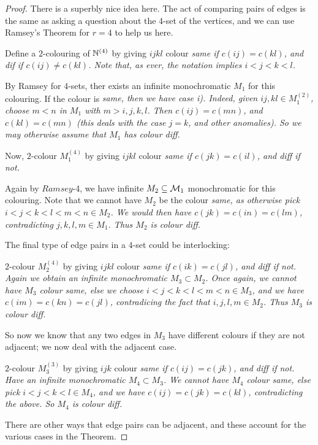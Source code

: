 \documentclass[10pt]{article}
\begin{document}
\begin{proof}
    There is a superbly nice idea here. The act of comparing pairs of edges is the same as asking a question about the 4-set of the vertices, and we can use Ramsey's Theorem for $r = 4$ to help us here.

    Define a $2$-colouring of $\mathbb{N}^{(4)}$ by giving $ijkl$ colour \it{same} if $c(ij) = c(kl)$, and \it{dif} if $c(ij)\ne c(kl)$. Note that, as ever, the notation implies $i<j<k<l$.

    By Ramsey for $4$-sets, ther exists an infinite monochromatic $M_1$ for this colouring. If the colour is \it{same}, then we have case i). Indeed, given $ij,kl\in M_1^{(2)}$, choose $m < n$ in $M_1$ with $m > i,j,k,l$. Then $c(ij) = c(mn)$, and $c(kl) = c(mn)$ (this deals with the case $j= k$, and other anomalies). So we may otherwise assume that $M_1$ has colour diff.

    Now, $2$-colour $M_1^{(4)}$ by giving $ijkl$ colour \it{same} if $c(jk) = c(il)$, and \it{diff} if not.

    Again by $Ramsey$-4, we have infinite $M_2\subseteq \mathcal{M}_1$ monochromatic for this colouring. Note that we cannot have $M_2$ be the colour \it{same}, as otherwise pick $i < j < k < l < m < n \in M_2$. We would then have $c(jk) = c(in) = c(lm)$, contradicting $j,k,l,m \in M_1$. Thus $M_2$ is colour \it{diff}.

    The final type of edge pairs in a $4$-set could be interlocking:

    $2$-colour $M_2^{(4)}$ by giving $ijkl$ colour \it{same} if $c(ik) = c(jl)$, and \it{diff} if not. Again we obtain an infinite monochromatic $M_3 \subset M_2$. Once again, we cannot have $M_3$ colour \it{same}, else we choose $i < j < k < l < m < n \in M_3$, and we have $c(im) = c(kn) = c(jl)$, contradicing the fact that $i,j,l,m \in M_2$. Thus $M_3$ is colour \it{diff}.

    So now we know that any two edges in $M_3$ have different colours if they are not adjacent; we now deal with the adjacent case.

    $2$-colour $M_3^{(3)}$ by giving $ijk$ colour \it{same} if $c(ij) = c(jk)$, and \it{diff} if not. Have an infinite monochromatic $M_4 \subset M_3$. We cannot have $M_4$ colour \it{same}, else pick $i < j < k < l \in M_4$, and we have $c(ij) = c(jk) = c(kl)$, contradicting the above. So $M_4$ is colour \it{diff}.

    There are other ways that edge pairs can be adjacent, and these account for the various cases in the Theorem.


\end{proof}
\end{document}
